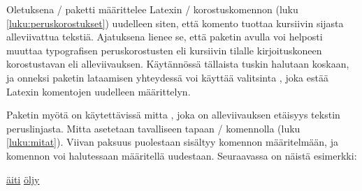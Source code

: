 
Oletuksena \-/ paketti määrittelee Latexin
\-/ korostuskomennon (luku \ref{luku:peruskorostukset})
uudelleen siten, että komento tuottaa kursiivin sijasta alleviivattua
tekstiä. Ajatuksena lienee se, että paketin avulla voi helposti muuttaa
typografisen peruskorostusten eli kursiivin tilalle kirjoituskoneen
korostustavan eli alleviivauksen. Käytännössä tällaista tuskin halutaan
koskaan, ja onneksi paketin lataamisen yhteydessä voi käyttää valitsinta
, joka estää Latexin komentojen uudelleen
määrittelyn.

\begin{koodilohkosis}
  \usepackage[normalem]{ulem}
\end{koodilohkosis}

Paketin  myötä on käytettävissä mitta ,
joka on alleviivauksen etäisyys tekstin peruslinjasta. Mitta asetetaan
tavalliseen tapaan \-/ komennolla (luku
\ref{luku:mitat}). Viivan paksuus puolestaan sisältyy komennon
 määritelmään, ja komennon voi halutessaan
määritellä uudestaan. Seuraavassa on näistä esimerkki:

\begin{koodilohkosis}
  \setlength{\ULdepth}{.2ex}        %
  \renewcommand{\ULthickness}{.1ex} %
  \uline{äiti} \uline{öljy}
\end{koodilohkosis}

